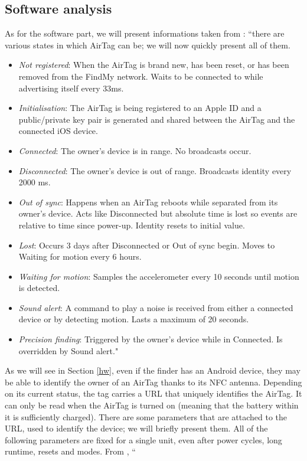 \documentclass[english]{article}
\begin{document}
\subsection{Software analysis}\label{sec:beacons}
As for the software part, we will present informations taken from \cite{reverse}: ``there are various states in which AirTag can be; we will now quickly present all of them.
\begin{itemize}
  \item \textit{Not registered}: When the AirTag is brand new, has been reset, or has been removed from the FindMy network. Waits to be connected to while advertising itself every 33ms.
  \item \textit{Initialisation}: The AirTag is being registered to an Apple ID and a public/private key pair is generated and shared between the AirTag and the connected iOS device.
  \item \textit{Connected}: The owner’s device is in range. No broadcasts occur.
  \item \textit{Disconnected}: The owner’s device is out of range. Broadcasts identity every 2000 ms.
  \item \textit{Out of sync}: Happens when an AirTag reboots while separated from its owner’s device. Acts like Disconnected but absolute time is lost so events are relative to time since power-up. Identity resets to initial value.
  \item \textit{Lost}: Occurs 3 days after Disconnected or Out of sync begin. Moves to Waiting for motion every 6 hours.
  \item \textit{Waiting for motion}: Samples the accelerometer every 10 seconds until motion is detected.
  \item \textit{Sound alert}: A command to play a noise is received from either a connected device or by detecting motion. Lasts a maximum of 20 seconds.
  \item \textit{Precision finding}: Triggered by the owner’s device while in Connected. Is overridden by Sound alert."
\end{itemize}
As we will see in Section \ref{hw}, even if the finder has an Android device, they may be able to identify the owner of an AirTag thanks to its NFC antenna. Depending on its current status, the tag carries a URL that uniquely identifies the AirTag. It can only be read when the AirTag is turned on (meaning that the battery within it is sufficiently charged). There are some parameters that are attached to the URL, used to identify the device; we will briefly present them. All of the following parameters are fixed for a single unit, even after power cycles, long runtime, resets and modes. From \cite{reverse}, ``
\end{document}
